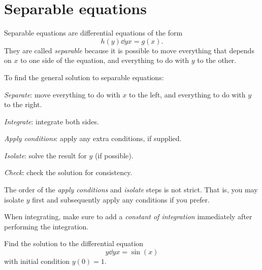 \documentclass{book}
\begin{document}
\section{Separable equations}

Separable equations are differential equations of the form
\begin{dmath}
  \label{eq:separable}
  h(y) \dd{y}{x} = g(x).
\end{dmath}
They are called \emph{separable} because it is possible to move
everything that depends on $x$ to one side of the equation, and
everything to do with $y$ to the other.

To find the general solution to separable equations:
\begin{enumerate*}
\item \emph{Separate}: move everything to do with $x$ to the left, and
  everything to do with $y$ to the right.
\item \emph{Integrate}: integrate both sides.
\item \emph{Apply conditions}: apply any extra conditions, if
  supplied.
\item \emph{Isolate}: solve the result for $y$ (if possible).
\item \emph{Check}: check the solution for consistency.
\end{enumerate*}

The order of the \emph{apply conditions} and \emph{isolate} steps is
not strict.  That is, you may isolate $y$ first and subsequently apply
any conditions if you prefer.

\begin{heads}
  When integrating, make sure to add a \emph{constant of integration}
  immediately after performing the integration.
\end{heads}

\newpage
\begin{easyexample}
  Find the solution to the differential equation
  \begin{dmath}
    \label{eq:ex:separable}
    y \dd{y}{x} = \sin(x)
  \end{dmath}
  with initial condition $y(0) = 1$.
\end{easyexample}
\end{document}
